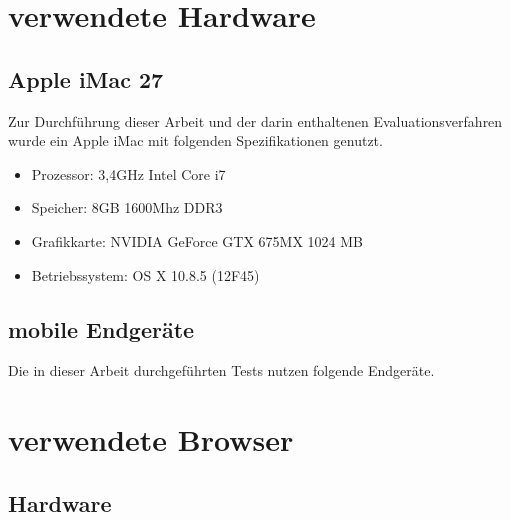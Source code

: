 	\section{verwendete Hardware}
	
	\subsection{Apple iMac 27\texttt\dq}
	Zur Durchführung dieser Arbeit und der darin enthaltenen Evaluationsverfahren wurde ein Apple iMac mit folgenden 				Spezifikationen genutzt.
	\begin{itemize} 
		\item Prozessor: 3,4GHz Intel Core i7 
		\item Speicher: 8GB 1600Mhz DDR3
		\item Grafikkarte: NVIDIA GeForce GTX 675MX 1024 MB
		\item Betriebssystem: OS X 10.8.5 (12F45)
	\end{itemize}
	
	\pagebreak
	\subsection{mobile Endgeräte}
	Die in dieser Arbeit durchgeführten Tests nutzen folgende Endgeräte. 
	
	
	\pagebreak
	\section{verwendete Browser}
		\subsection{}
		\subsection{Hardware}

